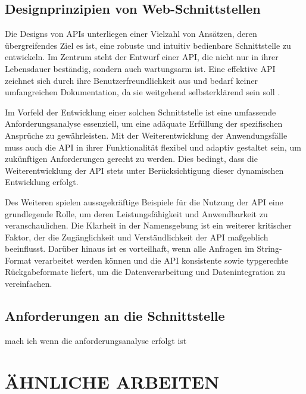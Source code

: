 \documentclass[draft,final]{vutinfth} %
\begin{document}
\section{Designprinzipien von Web-Schnittstellen}

Die Designs von APIs unterliegen einer Vielzahl von Ansätzen, deren übergreifendes Ziel es ist, eine robuste und intuitiv bedienbare Schnittstelle zu entwickeln. 
Im Zentrum steht der Entwurf einer API, die nicht nur in ihrer Lebensdauer beständig, sondern auch wartungsarm ist. 
Eine effektive API zeichnet sich durch ihre Benutzerfreundlichkeit aus und bedarf keiner umfangreichen Dokumentation, da sie weitgehend selbsterklärend sein soll \cite{How2Design_good_API}.

Im Vorfeld der Entwicklung einer solchen Schnittstelle ist eine umfassende Anforderungsanalyse essenziell, um eine adäquate Erfüllung der spezifischen Ansprüche zu gewährleisten. 
Mit der Weiterentwicklung der Anwendungsfälle muss auch die API in ihrer Funktionalität flexibel und adaptiv gestaltet sein, um zukünftigen Anforderungen gerecht zu werden. 
Dies bedingt, dass die Weiterentwicklung der API stets unter Berücksichtigung dieser dynamischen Entwicklung erfolgt. \cite{How2Design_good_API}

Des Weiteren spielen aussagekräftige Beispiele für die Nutzung der API eine grundlegende Rolle, um deren Leistungsfähigkeit und Anwendbarkeit zu veranschaulichen. 
Die Klarheit in der Namensgebung ist ein weiterer kritischer Faktor, der die Zugänglichkeit und Verständlichkeit der API maßgeblich beeinflusst. Darüber hinaus ist es vorteilhaft, wenn alle Anfragen im String-Format verarbeitet werden können und die API konsistente sowie typgerechte Rückgabeformate liefert, um die Datenverarbeitung und Datenintegration zu vereinfachen. \cite{How2Design_good_API}


\section{Anforderungen an die Schnittstelle}

mach ich wenn die anforderungsanalyse erfolgt ist












\chapter{ÄHNLICHE ARBEITEN}
\end{document}
